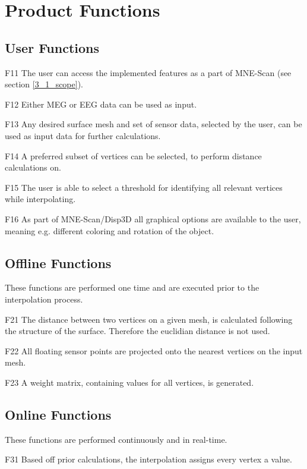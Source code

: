 \section{Product Functions}

\subsection{User Functions}

	\begin{aims}
	
		\item[F11] The user can access the implemented features as a part of MNE-Scan (see section \ref{3_1_scope}).
		\item[F12] Either MEG or EEG data can be used as input.
		\item[F13] Any desired surface mesh and set of sensor data, selected by the user, can be used as input data for 							further calculations.
		\item[F14] A preferred subset of vertices can be selected, to perform distance calculations on. 
		\item[F15] The user is able to select a threshold for identifying all relevant vertices while interpolating. 
		\item[F16] As part of MNE-Scan/Disp3D all graphical options are available to the user, meaning e.g. different 								coloring and rotation of the object.
	
	\end{aims}

\subsection{Offline Functions}
	
	These functions are performed one time and are executed prior to the interpolation process.	
	
	\begin{aims}
	
		\item[F21]	The distance between two vertices on a given mesh, is calculated following the structure of the surface. 						Therefore the euclidian distance is not used.
		\item[F22] All floating sensor points are projected onto the nearest vertices on the input mesh. 
		\item[F23] A weight matrix, containing values for all vertices, is generated. 
 	
	\end{aims}
	
\subsection{Online Functions}

	These functions are performed continuously and in real-time.	
	
	\begin{aims}
	
		\item[F31]	Based off prior calculations, the interpolation assigns every vertex a value.
	
	\end{aims}